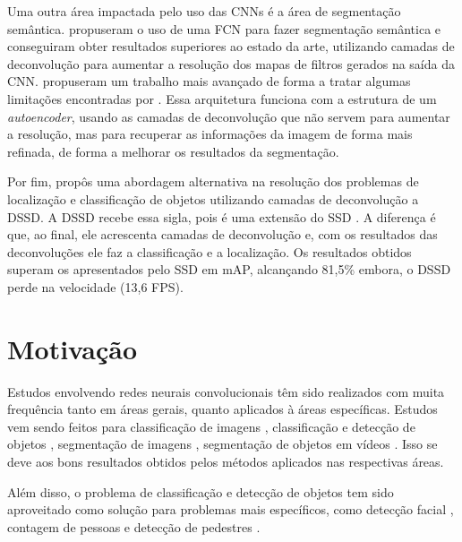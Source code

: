 Uma outra área impactada pelo uso das \ac{CNN}s é a área de segmentação semântica.  propuseram o uso de uma \ac{FCN} para fazer segmentação semântica e conseguiram obter resultados superiores ao estado da arte, utilizando camadas de deconvolução para aumentar a resolução dos mapas de filtros gerados na saída da \ac{CNN}.  propuseram um trabalho mais avançado de forma a tratar algumas limitações encontradas por . Essa arquitetura funciona com a estrutura de um \textit{autoencoder}, usando as camadas de deconvolução que não servem para aumentar a resolução, mas para recuperar as informações da imagem de forma mais refinada, de forma a melhorar os resultados da segmentação.

Por fim,  propôs uma abordagem alternativa na resolução dos problemas de localização e classificação de objetos utilizando camadas de deconvolução a \ac{DSSD}. A \ac{DSSD} recebe essa sigla, pois é uma extensão do \ac{SSD} \cite{wei-2015}. A diferença é que, ao final, ele acrescenta camadas de deconvolução e, com os resultados das deconvoluções ele faz a classificação e a localização. Os resultados obtidos superam os apresentados pelo \ac{SSD} em \ac{mAP}, alcançando 81,5\% embora, o  \ac{DSSD} perde na velocidade (13,6 FPS). 

\section{Motivação}
\label{secao:1:1}

Estudos envolvendo redes neurais convolucionais têm sido realizados com muita frequência tanto em áreas gerais, quanto aplicados à áreas específicas. Estudos vem sendo feitos para classificação de imagens \cite{krizhevsky-2012, simonyan-2014}, classificação e detecção de objetos , segmentação de imagens , segmentação de objetos em vídeos . Isso se deve aos bons resultados obtidos pelos métodos aplicados nas respectivas áreas.

Além disso, o problema de classificação e detecção de objetos tem sido aproveitado como solução para problemas mais específicos, como detecção facial \cite{yang-2018}, contagem de pessoas \cite{pren-2017} e detecção de pedestres \cite{lan-2018}. 

